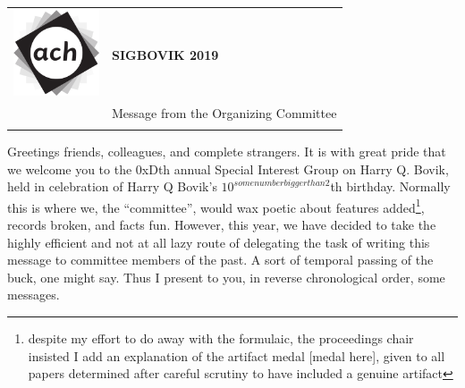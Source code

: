 \documentclass[12pt]{article}
\begin{document}
{\sffamily
\begin{tabular}{ll}
\multirow{3}{*}{\includegraphics[width=1in]{ach.png}}\\
& \textbf{\Huge{SIGBOVIK 2019}} \\ &\\
& \LARGE{Message from the Organizing Committee} \\
&\\
\hline
\end{tabular}}
\vspace{2em}
\thispagestyle{empty}

Greetings friends, colleagues, and complete strangers. It is with great pride that we welcome you to the 0xDth annual Special Interest Group on Harry Q. Bovik, held in celebration of Harry Q Bovik's $10^{somenumberbiggerthan2}$th birthday. Normally this is where we, the ``committee'', would wax poetic about  features added\footnote{despite my effort to do away with the formulaic, the proceedings chair insisted I add an explanation of the artifact medal [medal here], given to all papers determined after careful scrutiny to have included a genuine artifact}, records broken, and facts fun. However, this year, we have decided to take the highly efficient and not at all lazy route of delegating the task of writing this message to committee members of the past. A sort of temporal passing of the buck, one might say. Thus I present to you, in reverse chronological order, some messages.
\end{document}
